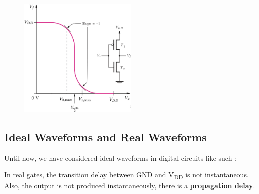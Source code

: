 \documentclass[12pt,openany, tikz,border=10pt]{book}
\begin{document}
			      	\begin{figure}[h]
			      		\centering
			      		\includegraphics[width=0.5\textwidth]{circuits/9.3.1.png} 
			      		\label{fig:voltage_transfer}
			      	\end{figure}
			      	
			      	\subsection{Ideal Waveforms and Real Waveforms}
			      	Until now, we have considered ideal waveforms in digital circuits like such :
			      	
			      	\begin{center}
			      		    
			      		
			      	\end{center}
			      	
			      	\newpage
			      	In real gates, the transition delay between GND and V\textsubscript{DD} is not instantaneous.
			      	Also, the output is not produced instantaneously, there is a \textbf{propagation delay}.
			      	
\end{document}
